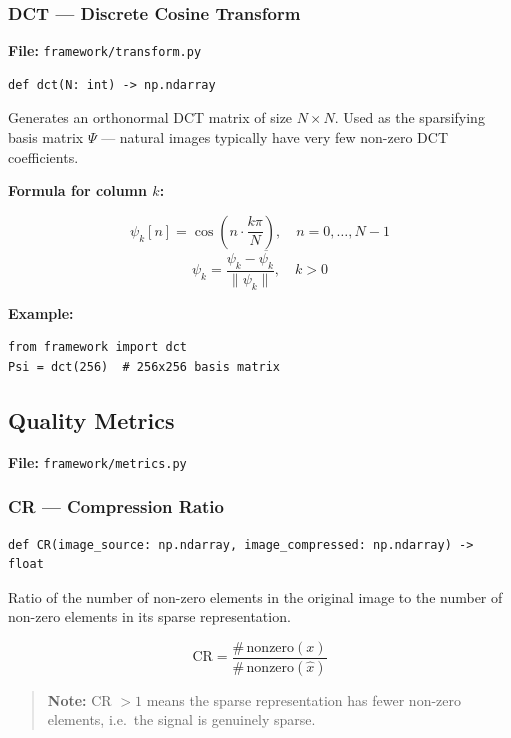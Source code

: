 \documentclass[12pt,a4paper]{article}
\newcommand{\cs}[1]{\texttt{#1}}          %
\begin{document}
\subsubsection{DCT --- Discrete Cosine Transform}

\textbf{File:} \cs{framework/transform.py}

\begin{lstlisting}[style=python]
def dct(N: int) -> np.ndarray
\end{lstlisting}

Generates an orthonormal DCT matrix of size $N \times N$.  Used as the
sparsifying basis matrix $\Psi$ --- natural images typically have very few
non-zero DCT coefficients.

\textbf{Formula for column $k$:}

\[
  \psi_k[n] = \cos\!\left(n \cdot \frac{k\pi}{N}\right), \quad n = 0, \ldots, N-1
\]
\[
  \psi_k = \frac{\psi_k - \overline{\psi_k}}{\|\psi_k\|}, \quad k > 0
\]

\textbf{Example:}

\begin{lstlisting}[style=python]
from framework import dct
Psi = dct(256)  # 256x256 basis matrix
\end{lstlisting}

\subsection{Quality Metrics}

\textbf{File:} \cs{framework/metrics.py}

\subsubsection{CR --- Compression Ratio}

\begin{lstlisting}[style=python]
def CR(image_source: np.ndarray, image_compressed: np.ndarray) -> float
\end{lstlisting}

Ratio of the number of non-zero elements in the original image to the number
of non-zero elements in its sparse representation.

\[
  \mathrm{CR} = \frac{\#\,\mathrm{nonzero}(x)}{\#\,\mathrm{nonzero}(\hat{x})}
\]

\begin{quote}
  \textbf{Note:} CR $> 1$ means the sparse representation has fewer non-zero
  elements, i.e.\ the signal is genuinely sparse.
\end{quote}
\end{document}
